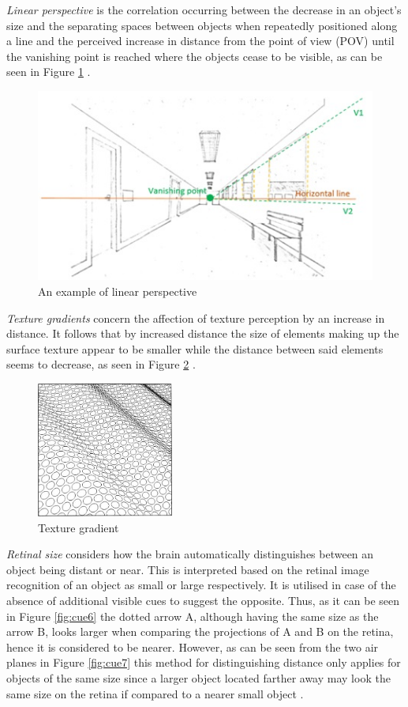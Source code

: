 \textit{Linear perspective} is the correlation occurring between the decrease in an object’s size and the separating spaces between objects when repeatedly positioned along a line and the perceived increase in distance from the point of view (POV) until the vanishing point is reached where the objects cease to be visible, as can be seen in Figure \ref{fig:cue4} \cite{Gale}.

\begin{figure}[h!]
   \centering
   \includegraphics[scale=0.8]{figures/cue4.jpg}
   \caption{An example of linear perspective}\label{fig:cue4}
\end{figure}

\textit{Texture gradients} concern the affection of texture perception by an increase in distance. It follows that by increased distance the size of elements making up the surface texture appear to be smaller while the distance between said elements seems to decrease, as seen in Figure \ref{fig:cue5} \cite{Gale}.

\begin{figure}[h!]
   \centering
   \includegraphics[width=0.4\textwidth]{figures/cue5.jpg}
   \caption{Texture gradient \cite{Heeger}}\label{fig:cue5}
\end{figure}

\textit{Retinal size} considers how the brain automatically distinguishes between an object being distant or near. This is interpreted based on the retinal image recognition of an object as small or large respectively. It is utilised in case of the absence of additional visible cues to suggest the opposite. Thus, as it can be seen in Figure \ref{fig:cue6} the dotted arrow A, although having the same size as the arrow B, looks larger when comparing the projections of A and B on the retina,  hence it is considered to be nearer. However, as can be seen from the two air planes in Figure \ref{fig:cue7} this method for distinguishing distance only applies for objects of the same size since a larger object located farther away may look the same size on the retina if compared to a nearer small object \cite{Gale}.

